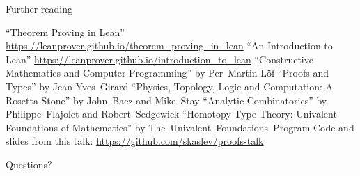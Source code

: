 \documentclass[pdf]{beamer}
\begin{document}
\begin{frame}{Further reading}
  \small
  \begin{outline}
    \1 ``Theorem Proving in Lean'' \url{https://leanprover.github.io/theorem_proving_in_lean}
    \1 ``An Introduction to Lean'' \url{https://leanprover.github.io/introduction_to_lean}
    \1 ``Constructive Mathematics and Computer Programming'' by \mbox{Per Martin-L\"{o}f}
    \1 ``Proofs and Types'' by \mbox{Jean-Yves Girard}
    \1 ``Physics, Topology, Logic and Computation: A Rosetta Stone'' by \mbox{John Baez} and \mbox{Mike Stay}
    \1 ``Analytic Combinatorics'' by \mbox{Philippe Flajolet} and \mbox{Robert Sedgewick}
    \1 ``Homotopy Type Theory: Univalent Foundations of Mathematics'' by \mbox{The Univalent Foundations Program}
    \1 Code and slides from this talk: \url{https://github.com/skaslev/proofs-talk}
  \end{outline}
\end{frame}

\begin{frame}{Questions?}
\end{frame}
\end{document}
